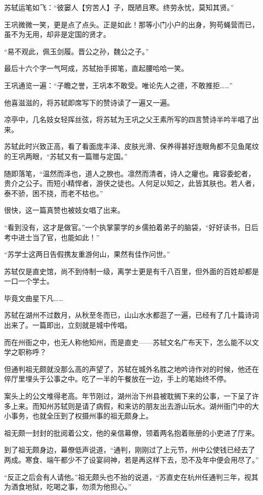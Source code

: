 苏轼运笔如飞：“彼窭人【穷苦人】子，既陋且寒。终劳永忧，莫知其贤。”

王巩微微一笑，更是点了点头。正是如此！那等小门小户的出身，狗苟蝇营而已，虽不为无用，却非是定国的贤才。

“易不观此，佩玉剑履。晋公之孙，魏公之子。”

最后十六个字一气呵成，苏轼抬手掷笔，直起腰哈哈一笑。

王巩通览一遍：“子瞻之誉，王巩本不敢受。唯论先人之德，不敢推拒……”

他喜滋滋的，将苏轼即席写下的赞诗读了一遍又一遍。

凉亭中，几名妓女轻挥丝弦，将苏轼为王巩之父王素所写的四言赞诗半吟半唱了出来。

苏轼此时兴致正高，看了看面庞丰泽、皮肤光滑、保养得甚好连眼角都不见鱼尾纹的王巩两眼，“苏轼又有一篇赠与定国。”

随即落笔，“温然而泽也，道人之腴也。凛然而清者，诗人之癯也。雍容委蛇者，贵介之公子。而短小精悍者，游侠之徒也。人何足以知之，此皆其肤也。若人者，泰不骄，困不挠，而老不枯也。”

很快，这一篇真赞也被妓女唱了出来。

“看到没有，这才是做官。”一个执掌蒙学的乡儒拍着弟子的脑袋，“好好读书，日后考中进士当了官，也能如此！”

“苏学士这两日告假携友重游何山，果然有佳作问世。”

苏轼仅是直史馆，尚不到侍制一级，离学士更是有千八百里，但外面的百姓却都是一口一个学士。

毕竟文曲星下凡……

苏轼在湖州不过数月，从秋至冬而已，山山水水都逛了一遍，已经有了几十篇诗词出来了。一篇即出，立刻就是城中传唱。

而在州衙之中，也无人称他知州，而是直史——苏轼文名广布天下，怎么能不以文学之职称呼？

但通判祖无颇就没那么高的声望了，苏轼在城外名胜之地吟诗作对的时候，他还在倅厅里埋头于公事之中。吃了一半的午餐放在一边，手上的笔始终不停。

案头上的公文堆得老高。年节刚过，湖州治下州县被耽搁下来的公事，一下呈了许多上来。而知州苏轼则是请了病假，和来访的朋友出去游山玩水。湖州衙门中的大小事务，也就全压到了权摄州事的祖无颇身上。

祖无颇一封封的批阅着公文，他的亲信幕僚，领着两名抱着账册的小吏进了厅来。

到了祖无颇身边，幕僚低声说道，“通判，刚刚过了上元节，州中公使钱已经去了两成。寒食、端午都少不了设宴祠神，若是再这样下去，恐不及年中便会用尽了。”

“反正之后会有人请他。”祖无颇头也不抬的说道，“苏直史在杭州任通判三年，视其为酒食地狱，吃喝之事，勿须为他担心。”

